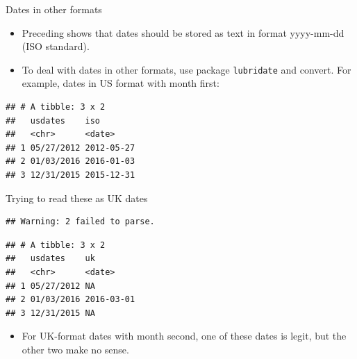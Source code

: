 \documentclass[ignorenonframetext,]{beamer}
\newenvironment{Shaded}{\begin{snugshade}}{\end{snugshade}}
\newcommand{\DataTypeTok}[1]{\textcolor[rgb]{0.13,0.29,0.53}{#1}}
\newcommand{\KeywordTok}[1]{\textcolor[rgb]{0.13,0.29,0.53}{\textbf{#1}}}
\newcommand{\NormalTok}[1]{#1}
\newcommand{\OperatorTok}[1]{\textcolor[rgb]{0.81,0.36,0.00}{\textbf{#1}}}
\newcommand{\StringTok}[1]{\textcolor[rgb]{0.31,0.60,0.02}{#1}}
\providecommand{\tightlist}{%
  \setlength{\itemsep}{0pt}\setlength{\parskip}{0pt}}
\begin{document}
\begin{frame}[fragile]{Dates in other formats}
\protect\hypertarget{dates-in-other-formats}{}

\begin{itemize}
\tightlist
\item
  Preceding shows that dates should be stored as text in format
  yyyy-mm-dd (ISO standard).
\item
  To deal with dates in other formats, use package \texttt{lubridate}
  and convert. For example, dates in US format with month first:
\end{itemize}

\begin{Shaded}
\end{Shaded}

\begin{verbatim}
## # A tibble: 3 x 2
##   usdates    iso       
##   <chr>      <date>    
## 1 05/27/2012 2012-05-27
## 2 01/03/2016 2016-01-03
## 3 12/31/2015 2015-12-31
\end{verbatim}

\end{frame}

\begin{frame}[fragile]{Trying to read these as UK dates}
\protect\hypertarget{trying-to-read-these-as-uk-dates}{}

\begin{Shaded}
\end{Shaded}

\begin{verbatim}
## Warning: 2 failed to parse.
\end{verbatim}

\begin{verbatim}
## # A tibble: 3 x 2
##   usdates    uk        
##   <chr>      <date>    
## 1 05/27/2012 NA        
## 2 01/03/2016 2016-03-01
## 3 12/31/2015 NA
\end{verbatim}

\begin{itemize}
\tightlist
\item
  For UK-format dates with month second, one of these dates is legit,
  but the other two make no sense.
\end{itemize}

\end{frame}
\end{document}
